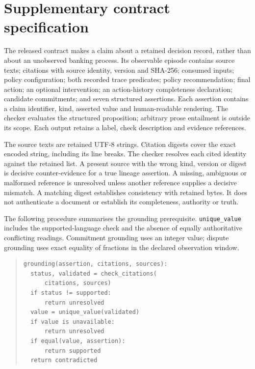 \section{Supplementary contract specification}
\label{app:contract}
\label{sec:supp-contract}

The released contract makes a claim about a retained decision record, rather than about an unobserved banking process. Its observable episode contains source texts; citations with source identity, version and SHA-256; consumed inputs; policy configuration; both recorded trace predicates; policy recommendation; final action; an optional intervention; an action-history completeness declaration; candidate commitments; and seven structured assertions. Each assertion contains a claim identifier, kind, asserted value and human-readable rendering. The checker evaluates the structured proposition; arbitrary prose entailment is outside its scope. Each output retains a label, check description and evidence references.

The source texts are retained UTF-8 strings. Citation digests cover the exact encoded string, including its line breaks. The checker resolves each cited identity against the retained list. A present source with the wrong kind, version or digest is decisive counter-evidence for a true lineage assertion. A missing, ambiguous or malformed reference is unresolved unless another reference supplies a decisive mismatch. A matching digest establishes consistency with retained bytes. It does not authenticate a document or establish its completeness, authority or truth.

The following procedure summarises the grounding prerequisite. \texttt{unique\_value} includes the supported-language check and the absence of equally authoritative conflicting readings. Commitment grounding uses an integer value; dispute grounding uses exact equality of fractions in the declared observation window.

\begin{quote}
\small
\begin{verbatim}
grounding(assertion, citations, sources):
  status, validated = check_citations(
      citations, sources)
  if status != supported:
      return unresolved
  value = unique_value(validated)
  if value is unavailable:
      return unresolved
  if equal(value, assertion):
      return supported
  return contradicted
\end{verbatim}
\end{quote}

